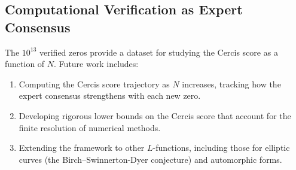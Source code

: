 \documentclass[12pt,a4paper]{article}
\theoremstyle{remark}
\begin{document}
\subsection{Computational Verification as Expert Consensus}
\label{sec:comp_consensus}
The $10^{13}$ verified zeros provide a dataset for studying the Cercis
score as a function of $N$. Future work includes:
\begin{enumerate}
  \item Computing the Cercis score trajectory as $N$ increases, tracking
        how the expert consensus strengthens with each new zero.
  \item Developing rigorous lower bounds on the Cercis score that account
        for the finite resolution of numerical methods.
  \item Extending the framework to other $L$-functions, including those
        for elliptic curves (the Birch--Swinnerton-Dyer conjecture) and
        automorphic forms.
\end{enumerate}
\end{document}
